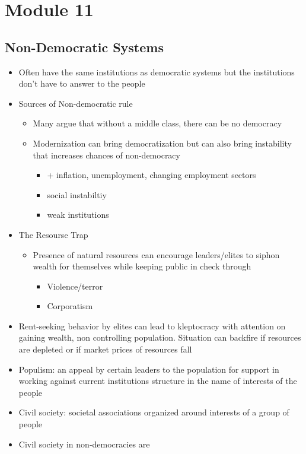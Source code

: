 \documentclass[11pt]{article}
\begin{document}
\section{Module 11}
\label{sec:org970884e}
\subsection{Non-Democratic Systems}
\label{sec:org4b23bac}
\begin{itemize}
\item Often have the same institutions as democratic systems but the institutions don't have to answer to the people
\item Sources of Non-democratic rule
\begin{itemize}
\item Many argue that without a middle class, there can be no democracy
\item Modernization can bring democratization but can also bring instability that increases chances of non-democracy
\begin{itemize}
\item + inflation, unemployment, changing employment sectors
\item social instabiltiy
\item weak institutions
\end{itemize}
\end{itemize}
\item The Resourse Trap
\begin{itemize}
\item Presence of natural resources can encourage leaders/elites to siphon wealth for themselves while keeping public in check through
\begin{itemize}
\item Violence/terror
\item Corporatism
\end{itemize}
\end{itemize}
\item Rent-seeking behavior by elites can lead to kleptocracy with attention on gaining wealth, non controlling population. Situation can backfire if resources are depleted or if market prices of resources fall
\item Populism: an appeal by certain leaders to the population for support in working against current institutions structure in the name of interests of the people
\item Civil society: societal associations organized around interests of a group of people
\item Civil society in non-democracies are

\end{itemize}
\end{document}
